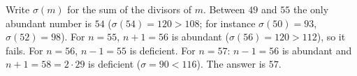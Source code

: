 Write $\sigma(m)$ for the sum of the divisors of $m$. Between $49$ and $55$ the only abundant number is $54$ ($\sigma(54)=120>108$; for instance $\sigma(50)=93$, $\sigma(52)=98$). For $n=55$, $n+1=56$ is abundant ($\sigma(56)=120>112$), so it fails. For $n=56$, $n-1=55$ is deficient. For $n=57$: $n-1=56$ is abundant and $n+1=58=2\cdot29$ is deficient ($\sigma=90<116$). The answer is $\boxed{57}$.
